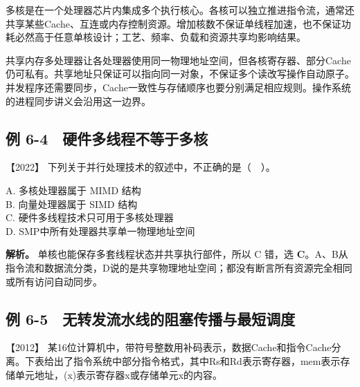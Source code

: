 多核是在一个处理器芯片内集成多个执行核心。各核可以独立推进指令流，通常还共享某些Cache、互连或内存控制资源。增加核数不保证单线程加速，也不保证功耗必然高于任意单核设计；工艺、频率、负载和资源共享均影响结果。

共享内存多处理器让各处理器使用同一物理地址空间，但各核寄存器、部分Cache仍可私有。共享地址只保证可以指向同一对象，不保证多个读改写操作自动原子。并发程序还需要同步，Cache一致性与存储顺序也要分别满足相应规则。操作系统的进程同步讲义会沿用这一边界。

\subsection{例 6-4　硬件多线程不等于多核}\label{co-ex6-4}

\noindent{}【2022】 下列关于并行处理技术的叙述中，不正确的是（　）。

A. 多核处理器属于 MIMD 结构\\
B. 向量处理器属于 SIMD 结构\\
C. 硬件多线程技术只可用于多核处理器\\
D. SMP中所有处理器共享单一物理地址空间


\textbf{解析。} 单核也能保存多套线程状态并共享执行部件，所以 C 错，选 \textbf{C}。A、B从指令流和数据流分类，D说的是共享物理地址空间；都没有断言所有资源完全相同或所有访问自动同步。

\subsection{例 6-5　无转发流水线的阻塞传播与最短调度}\label{co-ex6-5}

\noindent{}【2012】 某16位计算机中，带符号整数用补码表示，数据Cache和指令Cache分离。下表给出了指令系统中部分指令格式，其中Rs和Rd表示寄存器，mem表示存储单元地址，(x)表示寄存器x或存储单元x的内容。

